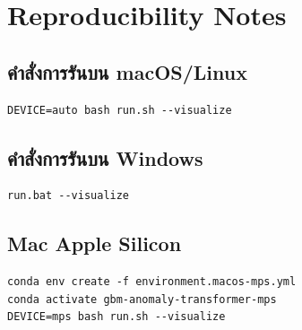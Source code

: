 \chapter{Reproducibility Notes}

\section{คำสั่งการรันบน macOS/Linux}

\begin{verbatim}
DEVICE=auto bash run.sh --visualize
\end{verbatim}

\section{คำสั่งการรันบน Windows}

\begin{verbatim}
run.bat --visualize
\end{verbatim}

\section{Mac Apple Silicon}

\begin{verbatim}
conda env create -f environment.macos-mps.yml
conda activate gbm-anomaly-transformer-mps
DEVICE=mps bash run.sh --visualize
\end{verbatim}

